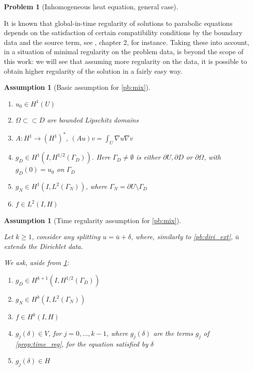 \documentclass[english,a4paper,9pt,oneside]{scrbook}	%
\theoremstyle{break}
\newtheorem{ass}[equation]{Assumption}
\newtheorem{pb}[equation]{Problem}
\theoremstyle{remark}
\newcommand{\cc}{\subset\subset}
\begin{document}
\begin{appendices}
\begin{pb}[Inhomogeneous heat equation, general case]
\end{pb}

It is known that global-in-time regularity of solutions to parabolic equations depends on the satisfaction of certain compatibility conditions by the boundary data and the source term, see \cite{lions}, chapter 2, for instance. Taking these into account, in a situation of minimal regularity on the problem data, is beyond the scope of this work: we will see that assuming more regularity on the data, it is possible to obtain higher regularity of the solution in a fairly easy way.

\begin{ass}[Basic assumption for \cref{pb:mix}]
\label{ass:basic_par_mix}
\textcolor{white}{ }
\begin{enumerate}
	\item $u_0 \in H^1(U)$
	\item $\Omega \cc D$ are bounded Lipschitz domains
	\item $A: H^1 \rightarrow (H^1)^*$, $(Au)v = \int_U \nabla u \nabla v$
	\item $g_D \in H^1(I, H^{1/2}(\Gamma_D))$. Here $\Gamma_D\neq \emptyset$ is either $\partial U, \partial D $ or $\partial \Omega$, with $g_D(0) = u_0$ on $\Gamma_D$
	\item $g_N \in H^1(I, L^2(\Gamma_N))$, where $\Gamma_N = \partial U \setminus \Gamma_D$
	\item $f \in L^2(I, H)$
\end{enumerate}
\end{ass}

\begin{ass}[Time regularity assumption for \cref{pb:mix}]
\label{ass:time_reg_mix}

Let $k\geq 1$, consider any splitting $u = \bar{u} + \delta$, where, similarly to \cref{pb:diri_ext}, $\bar{u}$ extends the Dirichlet data.

We ask, aside from \cref{ass:basic_par_mix}:

\begin{enumerate}
	\item $g_D \in H^{k+1}(I, H^{1/2}(\Gamma_D))$
	\item $g_N \in H^{k}(I, L^2(\Gamma_N))$
	\item $f \in H^k(I, H)$
	\item $g_j(\delta)  \in V$, for $j=0,...,k-1$, where $g_j(\delta)$ are the terms $g_j$ of \cref{prop:time_reg}, for the equation satisfied by $\delta$
	\item $g_j(\delta) \in H$
\end{enumerate}
\end{ass}


\end{appendices}
\end{document}
